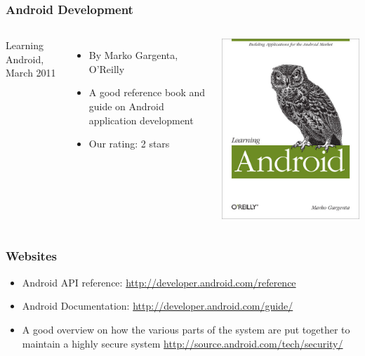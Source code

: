 \begin{frame}
  \frametitle{Android Development}
  \begin{columns}
    Learning Android, March 2011
    \begin{itemize}
    \item By Marko Gargenta, O'Reilly
    \item A good reference book and guide on Android application
      development
    \item Our rating: 2 stars
    \end{itemize}
    \includegraphics[width=\textwidth]{slides/android-resources/learning-android.jpg}
  \end{columns}
\end{frame}

\begin{frame}
  \frametitle{Websites}
  \begin{itemize}
  \item Android API reference: \url{http://developer.android.com/reference}
  \item Android Documentation: \url{http://developer.android.com/guide/}
  \item A good overview on how the various parts of the system are put together
    to maintain a highly secure system
    \url{http://source.android.com/tech/security/}
  \end{itemize}
\end{frame}

